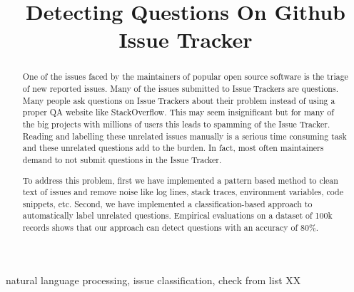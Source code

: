 \documentclass[conference]{IEEEtran}
\begin{document}
\title{Detecting Questions On Github Issue Tracker\\
}

\author{
}

\maketitle


\begin{abstract}
  One of the issues faced by the maintainers of popular open source software is the triage 
  of new reported issues. Many of the issues submitted to Issue Trackers are questions.
  Many people ask questions on Issue Trackers about their problem instead of using a proper QA 
  website like StackOverflow. This may seem insignificant but for many of the big projects 
  with millions of users this leads to spamming of the Issue Tracker. Reading and labelling
  these unrelated issues manually is a serious time consuming task and these unrelated questions 
  add to the burden. In fact, most often maintainers demand to not submit questions in the 
  Issue Tracker.

  To address this problem, first we have implemented a pattern based method
  to clean text of issues and remove noise like log lines, stack traces, environment variables, 
  code snippets, etc.
  Second, we have implemented a classification-based approach to automatically label unrelated questions. 
  Empirical evaluations on a dataset of 100k records shows that our approach 
  can detect questions with an accuracy of 80\%. 
\end{abstract}  

\begin{IEEEkeywords}
  natural language processing, issue classification, check from list XX
\end{IEEEkeywords}
\end{document}
